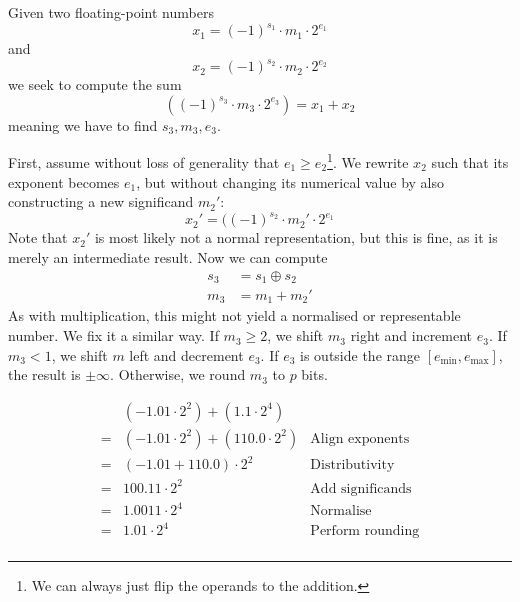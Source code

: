 Given two floating-point numbers
\[
  x_{1} = (-1)^{s_{1}} \cdot m_{1} \cdot 2^{e_{1}}
\]
and
\[
  x_{2} = (-1)^{s_{2}} \cdot m_{2} \cdot 2^{e_{2}}
\]
we seek to compute the sum
\begin{equation}
  ((-1)^{s_{3}} \cdot m_{3} \cdot 2^{e_{3}}) = x_{1} + x_{2}
\end{equation}
meaning we have to find $s_{3},m_{3},e_{3}$.

First, assume without loss of generality that
$e_{1} \geq e_{2}$\footnote{We can always just flip the operands to
  the addition.}.  We rewrite $x_{2}$ such that its exponent becomes
$e_{1}$, but without changing its numerical value by also constructing
a new significand $m_{2}'$:
\begin{equation}
  x_{2}' = ((-1)^{s_{2}} \cdot m_{2}' \cdot 2^{e_{1}}
\end{equation}
Note that $x_{2}'$ is most likely not a normal representation, but
this is fine, as it is merely an intermediate result.  Now we can compute
\begin{align}
  s_{3} &= s_{1} \oplus s_{2} \\
  m_{3} &= m_{1} + m_{2}'
\end{align}
As with multiplication, this might not yield a normalised or
representable number.  We fix it a similar way. If $m_{3}\geq{}2$, we
shift $m_{3}$ right and increment $e_{3}$.  If $m_{3}<1$, we shift $m$
left and decrement $e_{3}$.  If $e_{3}$ is outside the range
$[e_{\text{min}},e_{\text{max}}]$, the result is $\pm\infty$.
Otherwise, we round $m_{3}$ to $p$ bits.

\begin{example}[Addition with $p=3$]
  \[
    \begin{array}{rlr}
      & (-1.01 \cdot 2^{2}) + (1.1 \cdot 2^{4}) \\
      =& (-1.01 \cdot 2^{2}) + (110.0 \cdot 2^{2}) & \text{Align exponents} \\
      =& (-1.01+110.0) \cdot 2^{2} & \text{Distributivity} \\
      =& 100.11 \cdot 2^{2} & \text{Add significands} \\
      =& 1.0011 \cdot 2^{4} & \text{Normalise} \\
      =& 1.01 \cdot 2^{4} & \text{Perform rounding} \\
    \end{array}
  \]
\end{example}


